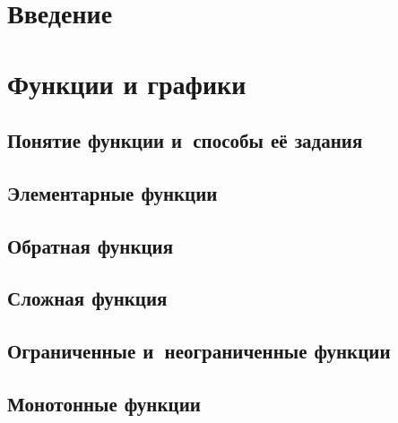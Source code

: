 \documentclass[14pt, oneside]{extbook}
\begin{document}
\chapter*{Введение}


\chapter{Функции и графики}
\section{Понятие функции и~способы её задания}

\section{Элементарные функции}\label{sec_1_2}

\section{Обратная функция}

\section{Сложная функция}

\section{Ограниченные и~неограниченные функции}

\section{Монотонные функции}

\end{document}
